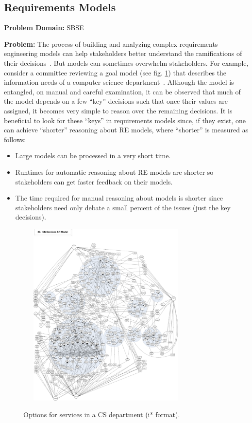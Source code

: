 \documentclass[sigconf,anonymous,review]{acmart}
\begin{document}
    \subsection{Requirements Models}
    \textbf{Problem Domain: } SBSE
    
    \noindent\textbf{Problem:} The process of building and analyzing complex requirements engineering models can help stakeholders better understand the ramifications of their decisions~\cite{Lamsweerde2001,amyot10}. But models can sometimes overwhelm stakeholders. For example, consider a committee reviewing a goal model (see fig. \ref{fig:csServices}) that describes the information needs of a computer science department~\cite{Horkoff2016}. Although the model is entangled, on manual and careful examination, it can be  observed that much of the model depends on a few ``key'' decisions such that once their values are assigned, it becomes very simple to reason over the remaining decisions. It is beneficial to look for these ``keys'' in requirements models since, if they exist, one can achieve ``shorter'' reasoning about RE models, where ``shorter'' is measured as follows:
    \begin{itemize}[leftmargin=*]
     \item{Large models can be processed in a very short time.}
     \item{Runtimes for automatic reasoning about RE models are shorter so stakeholders can get faster feedback on their models.}
     \item{The time required for manual reasoning about models is shorter since stakeholders need only debate a small percent of the issues (just the key decisions).}
    \end{itemize}
   
    
    \begin{figure}[!t] 
  ~~~\includegraphics[width=3.1in]{img/CSServices.pdf} 
    \caption{Options for services in a CS department (i* format).}
    \label{fig:csServices}
\end{figure}
\end{document}
